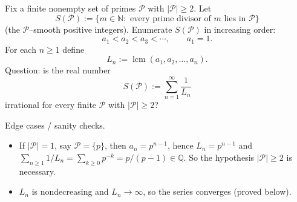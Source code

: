 Fix a finite nonempty set of primes $\mathcal{P}$ with $|\mathcal{P}|\ge 2$.  Let
\[
S(\mathcal{P}):=\{m\in\mathbb{N}:\text{ every prime divisor of }m\text{ lies in }\mathcal{P}\}
\]
(the $\mathcal{P}$--smooth positive integers).  Enumerate $S(\mathcal{P})$ in increasing order:
\[
a_1<a_2<a_3<\cdots,
\qquad a_1=1.
\]
For each $n\ge 1$ define
\[
L_n := \operatorname{lcm}(a_1,a_2,\dots,a_n).
\]
Question: is the real number
\[
S(\mathcal{P}):=\sum_{n=1}^\infty \frac{1}{L_n}
\]
irrational for every finite $\mathcal{P}$ with $|\mathcal{P}|\ge 2$?

Edge cases / sanity checks.
\begin{itemize}[itemsep=2pt]
\item If $|\mathcal{P}|=1$, say $\mathcal{P}=\{p\}$, then $a_n=p^{n-1}$, hence $L_n=p^{n-1}$ and $\sum_{n\ge 1}1/L_n=\sum_{k\ge 0}p^{-k}=p/(p-1)\in\mathbb{Q}$.  So the hypothesis $|\mathcal{P}|\ge 2$ is necessary.
\item $L_n$ is nondecreasing and $L_n\to\infty$, so the series converges (proved below).
\end{itemize}
